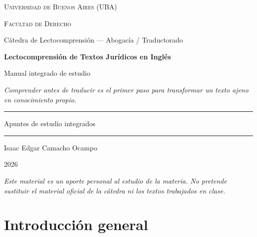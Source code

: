 \documentclass[12pt,oneside]{book}
\newcommand{\universidad}{Universidad de Buenos Aires (UBA)}
\newcommand{\facultad}{Facultad de Derecho}
\newcommand{\carrera}{Cátedra de Lectocomprensión --- Abogacía / Traductorado}
\newcommand{\materia}{Lectocomprensión de Textos Jurídicos en Inglés}
\newcommand{\titulo}{Manual integrado de estudio}
\newcommand{\autor}{Isaac Edgar Camacho Ocampo}
\newcommand{\anio}{2026}
\begin{document}
\begin{titlepage}
\thispagestyle{empty}
\begin{center}

\vspace*{1cm}
{\large \textsc{\universidad}}

\vspace{0.2cm}
{\large \textsc{\facultad}}

\vspace{0.2cm}
{\large \carrera}

\vspace{3cm}
{\Huge \textbf{\materia}}

\vspace{1cm}
{\LARGE \titulo}

\vspace{0.8cm}
\textit{Comprender antes de traducir es el primer paso para transformar un texto ajeno en conocimiento propio.}

\vspace{1.2cm}
\rule{0.70\textwidth}{0.5pt}

\vspace{0.5cm}
{\large Apuntes de estudio integrados}

\vspace{0.5cm}
\rule{0.70\textwidth}{0.5pt}

\vfill
{\large \autor}

\vspace{0.3cm}
{\large \anio}

\end{center}

\vfill
\begin{flushleft}
\textit{Este material es un aporte personal al estudio de la materia. No pretende sustituir el material oficial de la cátedra ni los textos trabajados en clase.}
\end{flushleft}
\end{titlepage}

\tableofcontents

\chapter*{Introducción general}
\end{document}
